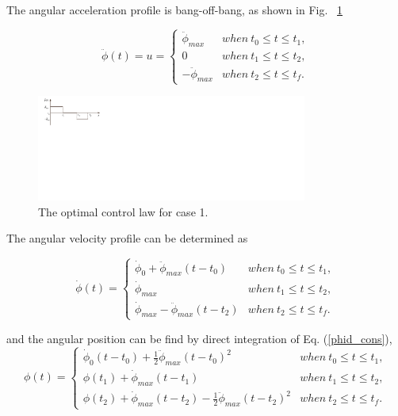 \documentclass[letterpaper, paper,12pt]{AAS}		%
\begin{document}
	The angular acceleration profile is bang-off-bang, as shown in Fig. ~\ref{bang_off_bang}

	\begin{equation}\label{phidd_cons}
	\ddot{\phi}(t)=u=\left\{
	\begin{array}{ll}
	\ddot{\phi}_{max}& when\  t_0\leq t\leq t_1,\\
	0& when\  t_1\leq t \leq t_2,\\
	-\ddot{\phi}_{max}& when \ t_2\leq t\leq t_f.
	\end{array}
	\right.
	\end{equation}

	\begin{figure}[H]
	\begin{center}
	\includegraphics[width=3.5in]{./Figures/bang_off_bang}
	\caption{The optimal control law for case 1.}
	\label{bang_off_bang}
	\end{center}
	\end{figure}
 The angular velocity profile can be determined as

	\begin{equation}\label{phid_cons}
	\dot{\phi}(t)=\left\{
	\begin{array}{ll}
	\dot{\phi}_0+\ddot{\phi}_{max}(t-t_0)& when\  t_0\leq t\leq t_1,\\
	\dot{\phi}_{max}& when\  t_1\leq t \leq t_2,\\
	\dot{\phi}_{max}-\ddot{\phi}_{max}(t-t_2)& when \ t_2\leq t\leq t_f.
	\end{array}
	\right.
	\end{equation}

and the angular position can be find by direct integration of Eq. (\ref{phid_cons}),
	\begin{equation}\label{phi_cons}
	\phi(t)=\left\{
	\begin{array}{ll}
	\dot{\phi}_0(t-t_0)+\frac{1}{2}\ddot{\phi}_{max}(t-t_0)^2& when\  t_0\leq t\leq t_1,\\
	\phi(t_1)+ \dot{\phi}_{max}(t-t_1)& when\  t_1\leq t \leq t_2,\\
	\phi(t_2)+\dot{\phi}_{max}(t-t_2)-\frac{1}{2}\ddot{\phi}_{max}(t-t_2)^2& when \ t_2\leq t\leq t_f.
	\end{array}
	\right.
	\end{equation}
	
\end{document}
